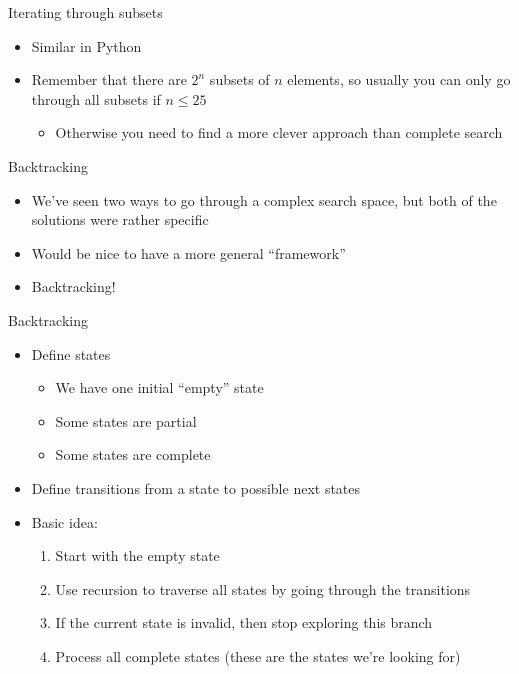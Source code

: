 \documentclass[10pt]{beamer}
\newcommand{\bi}{\begin{itemize}}
\newcommand{\ei}{\end{itemize}}
\begin{document}
\begin{frame}{Iterating through subsets}
    \bi
        \item Similar in Python
        \vspace{20pt}
        \item Remember that there are $2^n$ subsets of $n$ elements, so usually you can only go through all subsets if $n \leq 25$
            \bi
                \item Otherwise you need to find a more clever approach than complete search
            \ei
            \vspace{20pt}
    \ei
\end{frame}


\begin{frame}[fragile]{Backtracking}
    \bi
        \item We've seen two ways to go through a complex search space, but both of the solutions were rather specific
        \item Would be nice to have a more general ``framework''
        \vspace{10pt}
        \item Backtracking!
    \ei
\end{frame}

\begin{frame}[fragile]{Backtracking}
    \bi
        \item Define states
            \bi
                \item We have one initial ``empty'' state
                \item Some states are partial
                \item Some states are complete
            \ei
        \vspace{10pt}
        \item Define transitions from a state to possible next states
        \vspace{10pt}
        \item Basic idea:
            \begin{enumerate}
                \item Start with the empty state
                \item Use recursion to traverse all states by going through the transitions
                \item If the current state is invalid, then stop exploring this branch
                \item Process all complete states (these are the states we're looking for)
            \end{enumerate}
    \ei
\end{frame}
\end{document}
